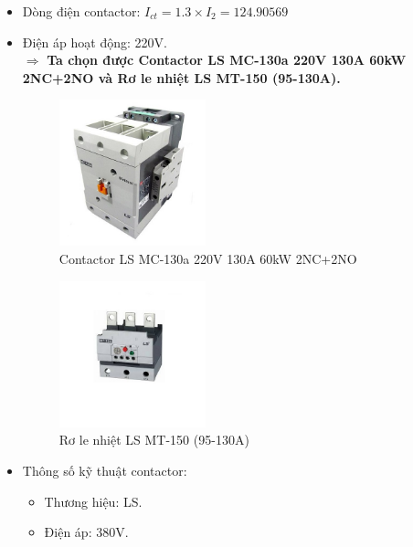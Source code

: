                 \begin{itemize}
                    \item Dòng điện contactor: $I_{ct} = 1.3 \times I_{2} = 124.90569$
                    \item Điện áp hoạt động: 220V.\\[0.2cm]
                        $\Rightarrow$ \textbf{Ta chọn được Contactor LS MC-130a 220V 130A 60kW 2NC+2NO và Rơ le nhiệt LS MT-150 (95-130A).}
                        \begin{figure}[H]
                            \centering
                            \includegraphics[width=0.4\textwidth]{pictures/2c1.png}
                            \caption{Contactor LS MC-130a 220V 130A 60kW 2NC+2NO}
                        \end{figure}
                        \begin{figure}[H]
                            \centering
                            \includegraphics[width=0.4\textwidth]{pictures/2c2.png}
                            \caption{Rơ le nhiệt LS MT-150 (95-130A)}
                        \end{figure}
                    \item Thông số kỹ thuật contactor:
                        \begin{itemize}
                            \item Thương hiệu: LS.
                            \item Điện áp: 380V.

\end{itemize}
\end{itemize}
